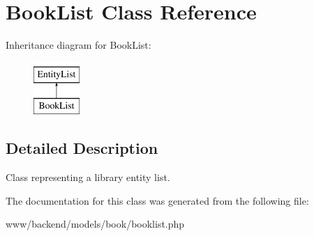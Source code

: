 \hypertarget{classBookList}{
\section{BookList Class Reference}
\label{classBookList}
}
Inheritance diagram for BookList:\begin{figure}[H]
\begin{center}
\leavevmode
\includegraphics[height=2.000000cm]{classBookList}
\end{center}
\end{figure}


\subsection{Detailed Description}
Class representing a library entity list. 

The documentation for this class was generated from the following file:\begin{DoxyCompactItemize}
\item 
www/backend/models/book/booklist.php\end{DoxyCompactItemize}
